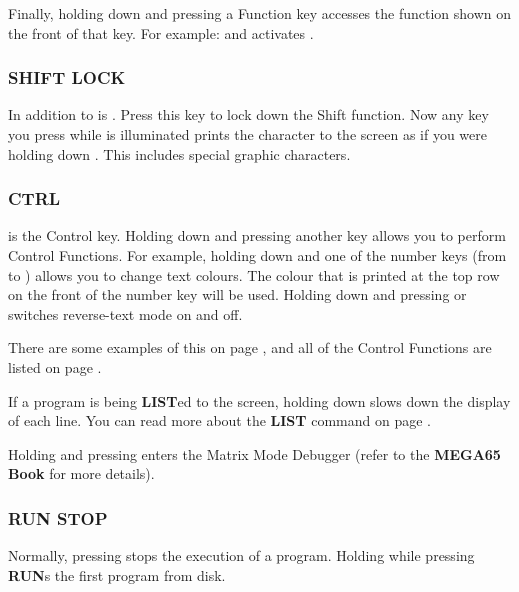 Finally, holding  down and pressing a Function key accesses the function shown on the front of that key. For example:  and  activates .


\subsubsection{SHIFT LOCK}
In addition to  is . Press this key to lock down the Shift function. Now any key you press while  is illuminated prints the character to the screen as if you were holding down . This includes special graphic characters.

\subsubsection{CTRL}
 is the Control key. Holding down  and pressing another key allows you to perform Control Functions. For example, holding down  and one of the number keys (from  to ) allows you to change text colours. The colour that is printed at the top row on the front of the number key will be used. Holding down  and pressing  or  switches reverse-text mode on and off.

There are some examples of this on page \pageref{sec:screen-editor}, and all of the Control Functions are listed on page \pageref{appendix:controlcodes}.

If a program is being {\bf LIST}ed to the screen, holding down  slows down the display of each line. You can read
more about the {\bf LIST} command on page \pageref{basic65-list}.

Holding  and pressing \megakey{*} enters the Matrix Mode Debugger (refer to the {\bf MEGA65 Book} for more details).

\subsubsection{RUN STOP}
Normally, pressing  stops the execution of a program. Holding  while pressing  {\bf RUN}s the first program from disk.

